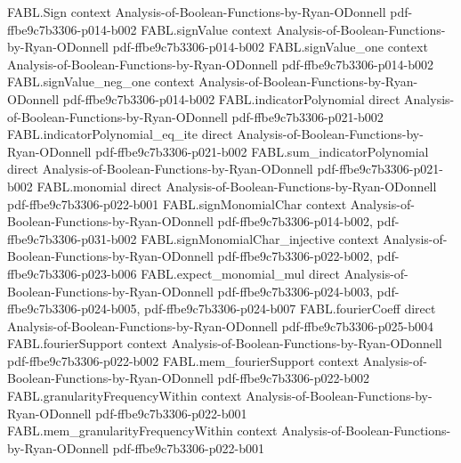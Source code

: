 \begin{theorem}
\label{FABL.plancherel}
\leanok
{}
\proofstep
  {FABL.Sign}
  {context}
  {Analysis-of-Boolean-Functions-by-Ryan-ODonnell}
  {pdf-ffbe9c7b3306-p014-b002}
\proofstep
  {FABL.signValue}
  {context}
  {Analysis-of-Boolean-Functions-by-Ryan-ODonnell}
  {pdf-ffbe9c7b3306-p014-b002}
\proofstep
  {FABL.signValue_one}
  {context}
  {Analysis-of-Boolean-Functions-by-Ryan-ODonnell}
  {pdf-ffbe9c7b3306-p014-b002}
\proofstep
  {FABL.signValue_neg_one}
  {context}
  {Analysis-of-Boolean-Functions-by-Ryan-ODonnell}
  {pdf-ffbe9c7b3306-p014-b002}
\proofstep
  {FABL.indicatorPolynomial}
  {direct}
  {Analysis-of-Boolean-Functions-by-Ryan-ODonnell}
  {pdf-ffbe9c7b3306-p021-b002}
\proofstep
  {FABL.indicatorPolynomial_eq_ite}
  {direct}
  {Analysis-of-Boolean-Functions-by-Ryan-ODonnell}
  {pdf-ffbe9c7b3306-p021-b002}
\proofstep
  {FABL.sum_indicatorPolynomial}
  {direct}
  {Analysis-of-Boolean-Functions-by-Ryan-ODonnell}
  {pdf-ffbe9c7b3306-p021-b002}
\proofstep
  {FABL.monomial}
  {direct}
  {Analysis-of-Boolean-Functions-by-Ryan-ODonnell}
  {pdf-ffbe9c7b3306-p022-b001}
\proofstep
  {FABL.signMonomialChar}
  {context}
  {Analysis-of-Boolean-Functions-by-Ryan-ODonnell}
  {pdf-ffbe9c7b3306-p014-b002,
    pdf-ffbe9c7b3306-p031-b002}
\proofstep
  {FABL.signMonomialChar_injective}
  {context}
  {Analysis-of-Boolean-Functions-by-Ryan-ODonnell}
  {pdf-ffbe9c7b3306-p022-b002,
    pdf-ffbe9c7b3306-p023-b006}
\proofstep
  {FABL.expect_monomial_mul}
  {direct}
  {Analysis-of-Boolean-Functions-by-Ryan-ODonnell}
  {pdf-ffbe9c7b3306-p024-b003,
    pdf-ffbe9c7b3306-p024-b005,
    pdf-ffbe9c7b3306-p024-b007}
\proofstep
  {FABL.fourierCoeff}
  {direct}
  {Analysis-of-Boolean-Functions-by-Ryan-ODonnell}
  {pdf-ffbe9c7b3306-p025-b004}
\proofstep
  {FABL.fourierSupport}
  {context}
  {Analysis-of-Boolean-Functions-by-Ryan-ODonnell}
  {pdf-ffbe9c7b3306-p022-b002}
\proofstep
  {FABL.mem_fourierSupport}
  {context}
  {Analysis-of-Boolean-Functions-by-Ryan-ODonnell}
  {pdf-ffbe9c7b3306-p022-b002}
\proofstep
  {FABL.granularityFrequencyWithin}
  {context}
  {Analysis-of-Boolean-Functions-by-Ryan-ODonnell}
  {pdf-ffbe9c7b3306-p022-b001}
\proofstep
  {FABL.mem_granularityFrequencyWithin}
  {context}
  {Analysis-of-Boolean-Functions-by-Ryan-ODonnell}
  {pdf-ffbe9c7b3306-p022-b001}

\end{theorem}
